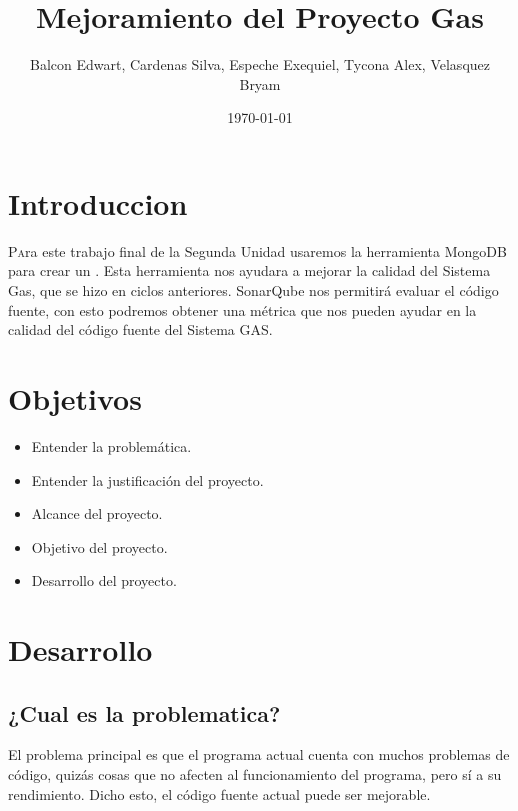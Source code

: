 \documentclass[twoside,twocolumn]{article}
\title{Mejoramiento del Proyecto Gas} %
\author{Balcon Edwart, Cardenas Silva, Espeche Exequiel, Tycona Alex, Velasquez Bryam}
\date{\today} %
\begin{document}
\maketitle


\section{Introduccion}

\lettrine[nindent=0em,lines=2]{P}ara este trabajo final de la Segunda Unidad usaremos la herramienta MongoDB para crear un . Esta herramienta nos ayudara a mejorar la calidad del Sistema Gas, que se hizo en ciclos anteriores. SonarQube nos permitirá evaluar el código fuente, con esto podremos obtener una métrica que nos pueden ayudar en la calidad del código fuente del Sistema GAS.

\section{Objetivos}

\begin{itemize}
\item Entender la problemática.
\item Entender la justificación del proyecto.
\item Alcance del proyecto.
\item Objetivo del proyecto.
\item Desarrollo del proyecto.

\end{itemize}

\section{Desarrollo}

\subsection{¿Cual es la problematica?}
El problema principal es que el programa actual cuenta con muchos problemas de código, quizás cosas que no afecten al funcionamiento del programa, pero sí a su rendimiento. Dicho esto, el código fuente actual puede ser mejorable. 
 
\end{document}
